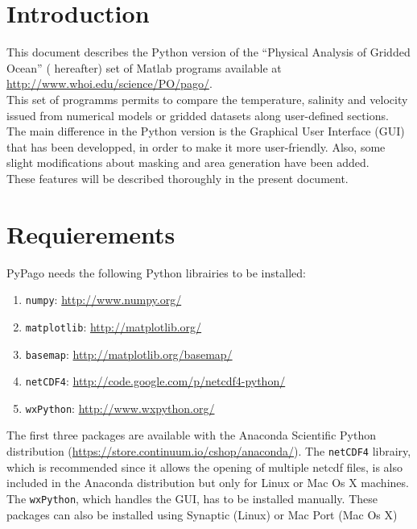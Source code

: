 \section{Introduction}

This document describes the Python version of the ``Physical Analysis
of Gridded Ocean'' (\pa{} hereafter) set of Matlab programs available at
\url{http://www.whoi.edu/science/PO/pago/}.\\

This set of programms permits to compare the temperature, salinity and
velocity issued from numerical models or gridded datasets along user-defined sections.\\

The main difference in the Python version is the Graphical User
Interface (GUI) that has been developped, in order to make it more
user-friendly. Also, some slight modifications about masking and area
generation have been added.\\

These features will be described thoroughly in the present document.

\section{Requierements}

PyPago needs the following Python librairies to be installed:

\begin{enumerate}
\item \verb+numpy+: \url{http://www.numpy.org/}
\item \verb+matplotlib+: \url{http://matplotlib.org/}
\item \verb+basemap+: \url{http://matplotlib.org/basemap/}
\item \verb+netCDF4+: \url{http://code.google.com/p/netcdf4-python/}
\item \verb+wxPython+: \url{http://www.wxpython.org/}
\end{enumerate}

The first three packages are available with the Anaconda Scientific
Python distribution (\url{https://store.continuum.io/cshop/anaconda/}). The \verb+netCDF4+
librairy, which is recommended since it allows the opening of multiple
netcdf files, is also included in the Anaconda distribution but only for
Linux or Mac Os X machines. The \verb+wxPython+, which handles the GUI, has
to be installed manually. These packages can also be installed using Synaptic (Linux) or Mac
Port (Mac Os X)



